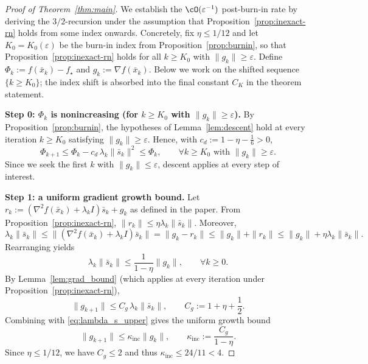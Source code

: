 \documentclass[review,onefignum,onetabnum]{siamart171218}
\begin{document}
	\begin{proof}[Proof of Theorem~\ref{thm:main}]
		We establish the $\cO(\varepsilon^{-1})$ post-burn-in rate
		by deriving the $3/2$-recursion under the assumption that
		Proposition~\ref{prop:inexact-rn} holds from some index onwards.
		Concretely, fix $\eta\le 1/12$ and let $K_0=K_0(\varepsilon)$ be
		the burn-in index from Proposition~\ref{prop:burnin}, so that
		Proposition~\ref{prop:inexact-rn} holds for all $k\ge K_0$ with
		$\|g_k\|\ge\varepsilon$.
		Define $\Phi_k:=f(\bar x_k)-f_\star$ and $g_k:=\nabla f(\bar x_k)$.
		Below we work on the shifted sequence $\{k\ge K_0\}$; the
		index shift is absorbed into the final constant $C_K$ in the
		theorem statement.
		
		\smallskip
		\noindent\textbf{Step 0: $\Phi_k$ is nonincreasing (for $k\ge K_0$ with $\|g_k\|\ge\varepsilon$).}
		By Proposition~\ref{prop:burnin}, the hypotheses of Lemma~\ref{lem:descent} hold at every iteration $k\ge K_0$ satisfying $\|g_k\|\ge\varepsilon$.
		Hence, with $c_d:=1-\eta-\frac16>0$,
		\begin{equation}\label{eq:Phi_monotone}
			\Phi_{k+1}\le \Phi_k - c_d\,\lambda_k\|\bar s_k\|^2\le \Phi_k,
			\qquad \forall k\ge K_0 \text{ with } \|g_k\|\ge\varepsilon.
		\end{equation}
		Since we seek the first $k$ with $\|g_k\|\le\varepsilon$, descent applies at every step of interest.
		
		\smallskip
		\noindent\textbf{Step 1: a uniform gradient growth bound.}
		Let $r_k:=(\nabla^2 f(\bar x_k)+\lambda_k I)\bar s_k+g_k$ as defined in the paper.
		From Proposition~\ref{prop:inexact-rn}, $\|r_k\|\le \eta\lambda_k\|\bar s_k\|$.
		Moreover,
		\[
		\lambda_k\|\bar s_k\|
		\le \|(\nabla^2 f(\bar x_k)+\lambda_k I)\bar s_k\|
		=\|g_k-r_k\|
		\le \|g_k\|+\|r_k\|
		\le \|g_k\|+\eta\lambda_k\|\bar s_k\|.
		\]
		Rearranging yields
		\begin{equation}\label{eq:lambda_s_upper}
			\lambda_k\|\bar s_k\|\le \frac{1}{1-\eta}\|g_k\|,\qquad \forall k\ge 0.
		\end{equation}
		By Lemma~\ref{lem:grad_bound} (which applies at every iteration under Proposition~\ref{prop:inexact-rn}),
		\[
		\|g_{k+1}\|\le C_g\,\lambda_k\|\bar s_k\|,
		\qquad
		C_g:=1+\eta+\frac12.
		\]
		Combining with \eqref{eq:lambda_s_upper} gives the uniform growth bound
		\begin{equation}\label{eq:grad_growth}
			\|g_{k+1}\|\le \kappa_{\mathrm{inc}}\|g_k\|,
			\qquad
			\kappa_{\mathrm{inc}}:=\frac{C_g}{1-\eta}.
		\end{equation}
		Since $\eta\le 1/12$, we have $C_g\le 2$ and thus $\kappa_{\mathrm{inc}}\le 24/11<4$.
		

\end{proof}
\end{document}
